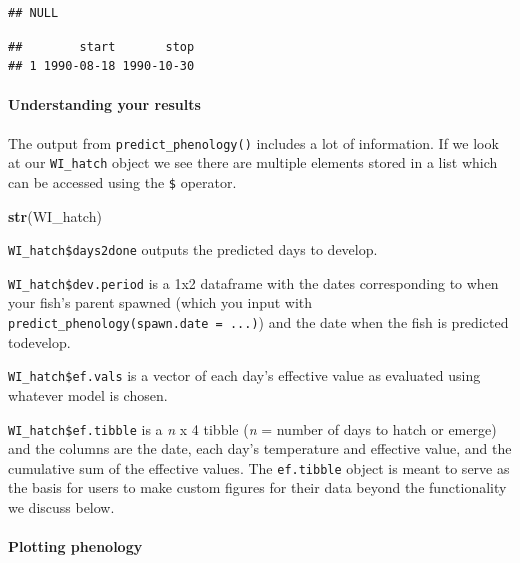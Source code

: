 \documentclass[webpdf,large,contemporary,namedate]{oup-authoring-template}
\newenvironment{Shaded}{\begin{snugshade}}{\end{snugshade}}
\newcommand{\FunctionTok}[1]{\textcolor[rgb]{0.13,0.29,0.53}{\textbf{#1}}}
\newcommand{\NormalTok}[1]{#1}
\newcommand{\SpecialCharTok}[1]{\textcolor[rgb]{0.81,0.36,0.00}{\textbf{#1}}}
\theoremstyle{thmstyleone}
\theoremstyle{thmstyletwo}
\theoremstyle{thmstylethree}
\begin{document}
\begin{verbatim}
## NULL
\end{verbatim}

\begin{Shaded}
\end{Shaded}

\begin{verbatim}
##        start       stop
## 1 1990-08-18 1990-10-30
\end{verbatim}

\paragraph{Understanding your results}\label{understanding-your-results}

The output from \texttt{predict\_phenology()} includes a lot of
information. If we look at our \texttt{WI\_hatch} object we see there
are multiple elements stored in a list which can be accessed using the
\texttt{\$} operator.

\begin{Shaded}
\begin{Highlighting}[]
\FunctionTok{str}\NormalTok{(WI\_hatch)}
\end{Highlighting}
\end{Shaded}

\texttt{WI\_hatch\$days2done} outputs the predicted days to develop.

\texttt{WI\_hatch\$dev.period} is a 1x2 dataframe with the dates
corresponding to when your fish's parent spawned (which you input with
\texttt{predict\_phenology(spawn.date\ =\ ...)}) and the date when the
fish is predicted todevelop.

\texttt{WI\_hatch\$ef.vals} is a vector of each day's effective value as
evaluated using whatever model is chosen.

\texttt{WI\_hatch\$ef.tibble} is a \emph{n} x 4 tibble (\emph{n} =
number of days to hatch or emerge) and the columns are the date, each
day's temperature and effective value, and the cumulative sum of the
effective values. The \texttt{ef.tibble} object is meant to serve as the
basis for users to make custom figures for their data beyond the
functionality we discuss below.

\paragraph{Plotting phenology}\label{plotting-phenology}
\end{document}
